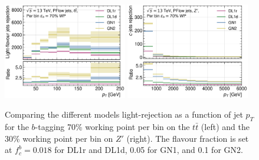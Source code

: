 \begin{figure}[h!]
  \centering
  \includegraphics[width=0.48\textwidth]{Images/FTAG/GN/GN2/pt_plots/pt_ttbar_flat_light_rej.png}
  \includegraphics[width=0.48\textwidth]{Images/FTAG/GN/GN2/pt_plots/pt_zp_flat_light_rej.png}
  \caption{Comparing the different models light-rejection as a function of jet $p_T$ for the $b$-tagging 70\% working point per bin on the $t\bar{t}$ (left) and the 30\% working point per bin on $Z'$ (right). The flavour fraction is set at $f^b_c = 0.018$ for DL1r and DL1d, 0.05 for GN1, and 0.1 for GN2.}
  \label{fig:GNxptb_urejflat}
\end{figure} 



